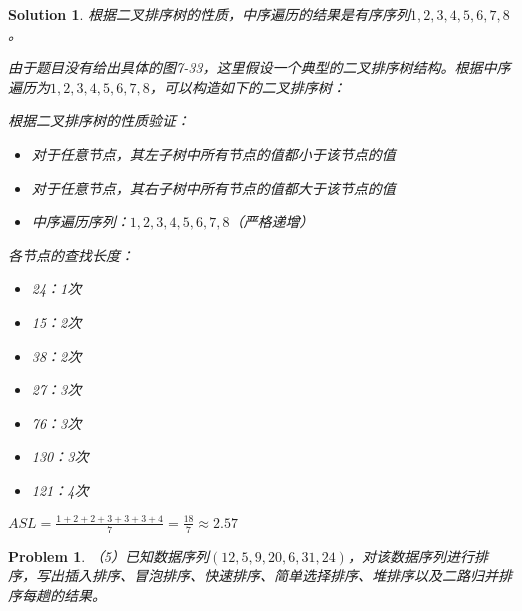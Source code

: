 \documentclass[12pt,a4paper]{amsart}
\newtheorem{problem}{Problem}[section]
\newtheorem{solution}{Solution}[section]
\begin{document}
\begin{solution}
根据二叉排序树的性质，中序遍历的结果是有序序列$1,2,3,4,5,6,7,8$。

由于题目没有给出具体的图7-33，这里假设一个典型的二叉排序树结构。根据中序遍历为$1,2,3,4,5,6,7,8$，可以构造如下的二叉排序树：

\begin{center}
\end{center}

根据二叉排序树的性质验证：
\begin{itemize}
\item 对于任意节点，其左子树中所有节点的值都小于该节点的值
\item 对于任意节点，其右子树中所有节点的值都大于该节点的值
\item 中序遍历序列：$1,2,3,4,5,6,7,8$（严格递增）
\end{itemize}
各节点的查找长度：
\begin{itemize}
\item 24：1次
\item 15：2次  
\item 38：2次
\item 27：3次
\item 76：3次
\item 130：3次
\item 121：4次
\end{itemize}

$ASL = \frac{1+2+2+3+3+3+4}{7} = \frac{18}{7} ≈ 2.57$
\end{solution}

\begin{problem}
（5）已知数据序列$(12,5,9,20,6,31,24)$，对该数据序列进行排序，写出插入排序、冒泡排序、快速排序、简单选择排序、堆排序以及二路归并排序每趟的结果。
\end{problem}
\end{document}
